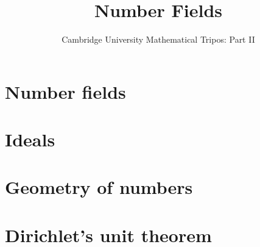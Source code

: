 \documentclass{article}
\title{Number Fields}
\author{Cambridge University Mathematical Tripos: Part II}
\begin{document}
\maketitle

\tableofcontentsnewpage{}

\section{Number fields}

\section{Ideals}

\section{Geometry of numbers}

\section{Dirichlet's unit theorem}

\end{document}

